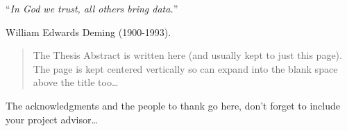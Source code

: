 \documentclass[
11pt, %
english, %
singlespacing, %
headsepline, %
]{mediaproject} %
\begin{document}
\cleardoublepage


\vspace*{0.2\textheight}

\begin{center}
\noindent\enquote{\itshape In God we trust, all others bring data.}\bigbreak  
\end{center}
\hfill William Edwards Deming (1900-1993).

\begin{abstract}
	\addchaptertocentry{\abstractname} %
	The Thesis Abstract is written here (and usually kept to just this page). The page is kept centered vertically so can expand into the blank space above the title too\ldots
\end{abstract}



\begin{acknowledgements}
\addchaptertocentry{\acknowledgementname} %
The acknowledgments and the people to thank go here, don't forget to include your project advisor\ldots
\end{acknowledgements}


\tableofcontents %

\listoffigures %

\listoftables %

\end{document}
